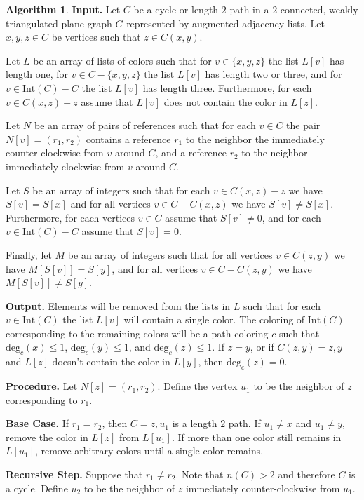 \documentclass[12pt,letterpaper]{article}
\theoremstyle{plain}
\theoremstyle{definition}
\theoremstyle{break}
\newtheorem{algorithm}[lemma]{Algorithm}     %
\begin{document}
\begin{algorithm}\label{A:hartman_impl}
\textbf{Input.} Let $C$ be a cycle or length $2$ path in a
$2$-connected, weakly triangulated plane graph $G$
represented by augmented adjacency lists. Let $x,y,z\in C$ be
vertices such that $z\in C(x,y)$.

Let $L$ be an array of lists of colors
such that for $v\in\{x,y,z\}$ the list $L[v]$ has length one,
for $v\in C-\{x,y,z\}$ the list $L[v]$ has length two
or three, and for $v\in \text{Int}(C)-C$ the list
$L[v]$ has length three. Furthermore, for each $v\in C(x,z) - z$ assume
that $L[v]$ does not contain the color in $L[z]$.

Let $N$ be an array of pairs of
references such that for each $v\in C$ the pair $N[v]=(r_1,r_2)$ contains
a reference $r_1$ to the neighbor the immediately counter-clockwise
from $v$
around $C$, and a reference $r_2$
to the neighbor immediately clockwise from $v$ around $C$.

Let $S$ be an array of
integers such that for each $v\in C(x,z)-z$ we have $S[v]=S[x]$ and for
all vertices $v\in C-C(x,z)$ we have $S[v]\ne S[x]$. Furthermore, for each
vertices $v\in C$ assume that $S[v]\ne 0$, and for each $v\in \text{Int}(C)-C$
assume that $S[v]=0$.

Finally, let $M$
be an array of integers such that for all vertices $v\in C(z,y)$ we have
$M[S[v]]=S[y]$, and for all vertices $v\in C-C(z,y)$ we have $M[S[v]]\ne
S[y]$.

\textbf{Output.} Elements will be removed from the lists in $L$ such that
for each $v\in\text{Int}(C)$ the list $L[v]$ will contain a single color. The
coloring of $\text{Int}(C)$ corresponding to the remaining
colors will be a path
coloring $c$ such that $\text{deg}_c(x)\le1$, $\text{deg}_c(y)\le1$, and
$\text{deg}_c(z)\le1$. If $z=y$, or if $C(z,y)=z,y$ and $L[z]$ doesn't contain
the color in $L[y]$, then $\text{deg}_c(z)=0$.

\textbf{Procedure.} Let $N[z]=(r_1,r_2)$. Define the vertex $u_1$ to be
the neighbor of $z$ corresponding to $r_1$.

\textbf{Base Case.} If $r_1=r_2$, then $C=z,u_1$
is a length $2$ path. If $u_1\ne x$ and $u_1\ne y$, remove the
color in $L[z]$ from $L[u_1]$. If more than one color still remains in
$L[u_1]$, remove arbitrary colors until a single color remains.

\textbf{Recursive Step.} Suppose that $r_1\ne r_2$. Note that
$n(C)>2$ and therefore $C$ is a cycle. Define $u_2$ to be the
neighbor of $z$ immediately counter-clockwise from $u_1$.


\end{algorithm}
\end{document}
